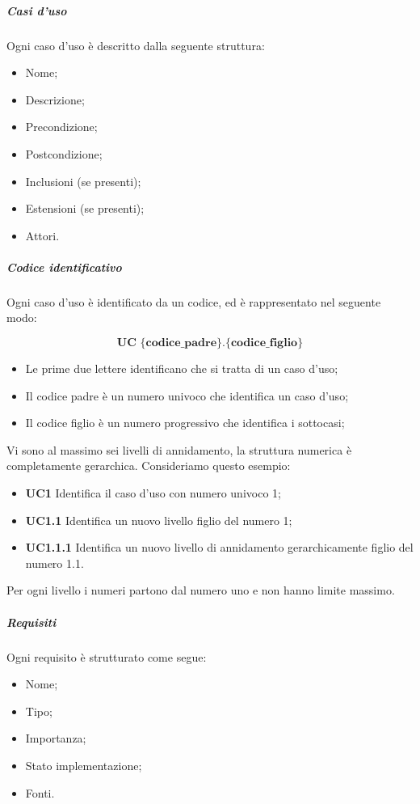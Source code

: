 			\subparagraph{Casi d'uso} \Spazio
			Ogni caso d'uso è descritto dalla seguente struttura:
			\begin{itemize}
				\item Nome;
				\item Descrizione;
				\item Precondizione;
				\item Postcondizione;
				\item Inclusioni (se presenti);
				\item Estensioni (se presenti);
				\item Attori.
			\end{itemize}

			\subparagraph{Codice identificativo} \Spazio
			Ogni caso d'uso è identificato da un codice, ed è rappresentato nel seguente modo:
			
		    $$ \textbf{UC \{codice\_padre\}.\{codice\_figlio\}  } $$
			
			\begin{itemize}
				\item Le prime due lettere identificano che si tratta di un caso d'uso;
				\item Il codice padre è un numero univoco che identifica un caso d'uso;
				\item Il codice figlio è un numero progressivo che identifica i sottocasi;
			\end{itemize}
		Vi sono al massimo sei livelli di annidamento, la struttura numerica è completamente gerarchica.
		Consideriamo questo esempio:
		\begin{itemize}
			\item \textbf{UC1} Identifica il caso d'uso con numero univoco 1;
			\item \textbf{UC1.1} Identifica un nuovo livello figlio del numero 1;
			\item \textbf{UC1.1.1} Identifica un nuovo livello di annidamento gerarchicamente figlio del numero 1.1.
		\end{itemize}
	    Per ogni livello i numeri partono dal numero uno e non hanno limite massimo. 
			\subparagraph{Requisiti} \Spazio
			Ogni requisito è strutturato come segue:
			\begin{itemize}
				\item Nome;
				\item Tipo;
				\item Importanza;
				\item Stato implementazione;
				\item Fonti.
			\end{itemize}
			
